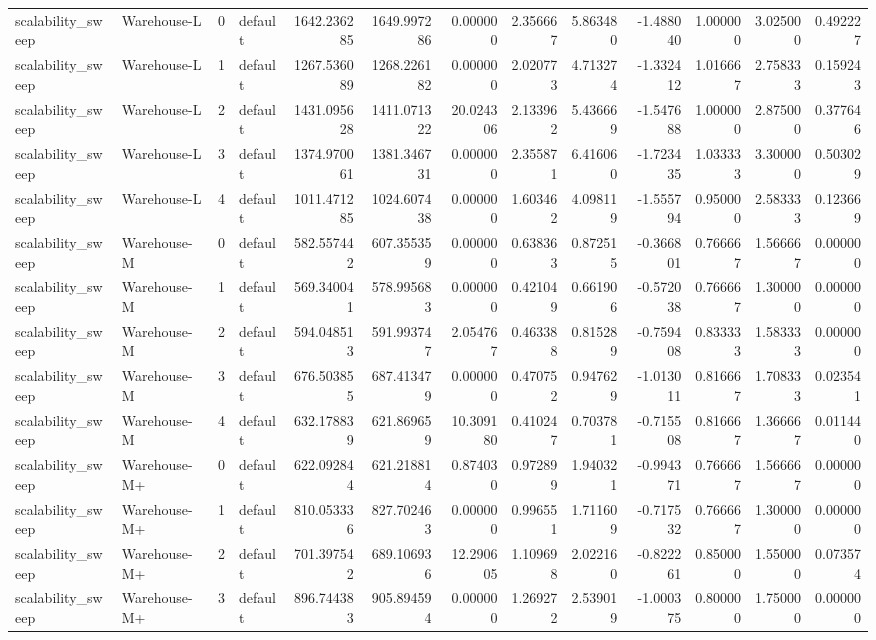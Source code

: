 \begin{tabular}{llrlrrrrrrrrr}
scalability\_sweep & Warehouse-L & 0 & default & 1642.236285 & 1649.997286 & 0.000000 & 2.356667 & 5.863480 & -1.488040 & 1.000000 & 3.025000 & 0.492227 \\
scalability\_sweep & Warehouse-L & 1 & default & 1267.536089 & 1268.226182 & 0.000000 & 2.020773 & 4.713274 & -1.332412 & 1.016667 & 2.758333 & 0.159243 \\
scalability\_sweep & Warehouse-L & 2 & default & 1431.095628 & 1411.071322 & 20.024306 & 2.133962 & 5.436669 & -1.547688 & 1.000000 & 2.875000 & 0.377646 \\
scalability\_sweep & Warehouse-L & 3 & default & 1374.970061 & 1381.346731 & 0.000000 & 2.355871 & 6.416060 & -1.723435 & 1.033333 & 3.300000 & 0.503029 \\
scalability\_sweep & Warehouse-L & 4 & default & 1011.471285 & 1024.607438 & 0.000000 & 1.603462 & 4.098119 & -1.555794 & 0.950000 & 2.583333 & 0.123669 \\
scalability\_sweep & Warehouse-M & 0 & default & 582.557442 & 607.355359 & 0.000000 & 0.638363 & 0.872515 & -0.366801 & 0.766667 & 1.566667 & 0.000000 \\
scalability\_sweep & Warehouse-M & 1 & default & 569.340041 & 578.995683 & 0.000000 & 0.421049 & 0.661906 & -0.572038 & 0.766667 & 1.300000 & 0.000000 \\
scalability\_sweep & Warehouse-M & 2 & default & 594.048513 & 591.993747 & 2.054767 & 0.463388 & 0.815289 & -0.759408 & 0.833333 & 1.583333 & 0.000000 \\
scalability\_sweep & Warehouse-M & 3 & default & 676.503855 & 687.413479 & 0.000000 & 0.470752 & 0.947629 & -1.013011 & 0.816667 & 1.708333 & 0.023541 \\
scalability\_sweep & Warehouse-M & 4 & default & 632.178839 & 621.869659 & 10.309180 & 0.410247 & 0.703781 & -0.715508 & 0.816667 & 1.366667 & 0.011440 \\
scalability\_sweep & Warehouse-M+ & 0 & default & 622.092844 & 621.218814 & 0.874030 & 0.972899 & 1.940321 & -0.994371 & 0.766667 & 1.566667 & 0.000000 \\
scalability\_sweep & Warehouse-M+ & 1 & default & 810.053336 & 827.702463 & 0.000000 & 0.996551 & 1.711609 & -0.717532 & 0.766667 & 1.300000 & 0.000000 \\
scalability\_sweep & Warehouse-M+ & 2 & default & 701.397542 & 689.106936 & 12.290605 & 1.109698 & 2.022160 & -0.822261 & 0.850000 & 1.550000 & 0.073574 \\
scalability\_sweep & Warehouse-M+ & 3 & default & 896.744383 & 905.894594 & 0.000000 & 1.269272 & 2.539019 & -1.000375 & 0.800000 & 1.750000 & 0.000000 \\

\end{tabular}
